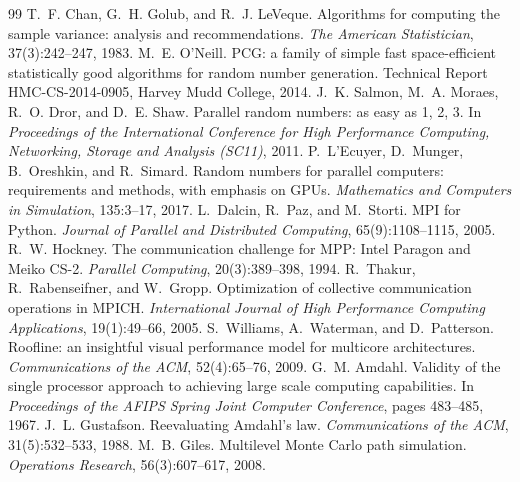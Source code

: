 \documentclass[11pt,a4paper]{article}
\begin{document}
\begin{thebibliography}{99}
 T.~F. Chan, G.~H. Golub, and R.~J. LeVeque. Algorithms for computing the sample variance: analysis and recommendations. \emph{The American Statistician}, 37(3):242--247, 1983.
 M.~E. O'Neill. PCG: a family of simple fast space-efficient statistically good algorithms for random number generation. Technical Report HMC-CS-2014-0905, Harvey Mudd College, 2014.
 J.~K. Salmon, M.~A. Moraes, R.~O. Dror, and D.~E. Shaw. Parallel random numbers: as easy as 1, 2, 3. In \emph{Proceedings of the International Conference for High Performance Computing, Networking, Storage and Analysis (SC11)}, 2011.
 P.~L'Ecuyer, D.~Munger, B.~Oreshkin, and R.~Simard. Random numbers for parallel computers: requirements and methods, with emphasis on GPUs. \emph{Mathematics and Computers in Simulation}, 135:3--17, 2017.
 L.~Dalcin, R.~Paz, and M.~Storti. MPI for Python. \emph{Journal of Parallel and Distributed Computing}, 65(9):1108--1115, 2005.
 R.~W. Hockney. The communication challenge for MPP: Intel Paragon and Meiko CS-2. \emph{Parallel Computing}, 20(3):389--398, 1994.
 R.~Thakur, R.~Rabenseifner, and W.~Gropp. Optimization of collective communication operations in MPICH. \emph{International Journal of High Performance Computing Applications}, 19(1):49--66, 2005.
 S.~Williams, A.~Waterman, and D.~Patterson. Roofline: an insightful visual performance model for multicore architectures. \emph{Communications of the ACM}, 52(4):65--76, 2009.
 G.~M. Amdahl. Validity of the single processor approach to achieving large scale computing capabilities. In \emph{Proceedings of the AFIPS Spring Joint Computer Conference}, pages 483--485, 1967.
 J.~L. Gustafson. Reevaluating Amdahl's law. \emph{Communications of the ACM}, 31(5):532--533, 1988.
 M.~B. Giles. Multilevel Monte Carlo path simulation. \emph{Operations Research}, 56(3):607--617, 2008.
\end{thebibliography}
\endgroup
\end{document}
